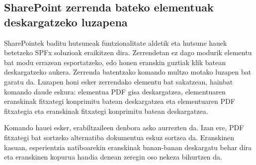\subsection{SharePoint zerrenda bateko elementuak deskargatzeko luzapena}
SharePointek baditu hutsuneak funtzionalitate aldetik eta hutsune hauek betetzeko SPFx soluzioak eraikitzen dira. Zerrendetan ez dago modurik elementu bat modu errazean esportatzeko, edo honen eranskin guztiak klik batean deskargatzeko aukera. Zerrenda batentzako komando multzo motako luzapen bat garatu da. Luzapen honi esker zerrendako elementu bat sakatzean, hainbat komando daude eskura: elementua PDF gisa deskargatzea, elementuaren eranskinak fitxategi konprimitu batean deskargatzea eta elementuaren PDF fitxategia eta eranskinak fitxategi konprimitu batean deskargatzea. 

Komando hauei esker, erabiltzaileen denbora asko aurrezten da. Izan ere, PDF fitxategi bat sortzeko alternatiba dokumentua eskuz sortzea da. Eranskinen kasuan, esperientzia natiboarekin eranskinak banan-banan deskargatu behar dira eta eranskinen kopurua handia denean zeregin oso nekeza bihurtzen da.



